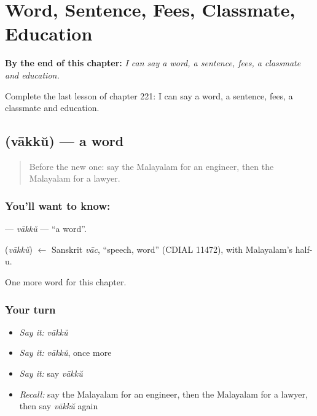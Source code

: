
\chapter{Word, Sentence, Fees, Classmate, Education}
\label{ch:ml-word-sentence-fees-classmate-education}

\begin{chapteropening}
\textbf{By the end of this chapter:} \emph{I can say a word, a sentence, fees, a classmate and education.}

Complete the last lesson of chapter 221: I can say a word, a sentence, fees, a classmate and education.
\end{chapteropening}

\section[\texorpdfstring{\ml{വാക്ക്} (vākkŭ)}{വാക്ക് (vākkŭ)}]{ (vākkŭ) — a word}

\label{lesson:ML-C221-vakku}



\begin{quote}
Before the new one: say the Malayalam for an engineer, then the Malayalam for a lawyer.
\end{quote}

\subsection*{You'll want to know: }
\textbf{} — \emph{vākkŭ} — \textquotedblleft{}a word\textquotedblright{}.

\begin{cousinweb}
\textbf{} (\emph{vākkŭ}) $\leftarrow$ Sanskrit \emph{vāc}, \textquotedblleft{}speech, word\textquotedblright{} (CDIAL 11472), with Malayalam's half-u.
\end{cousinweb}

\begin{grammarlens}[title={What you've built}]
One more word for this chapter.
\end{grammarlens}

\subsection*{Your turn}
\begin{itemize}
\raggedright
  \item \emph{Say it:} \emph{vākkŭ}
  \item \emph{Say it:} \emph{vākkŭ}, once more
  \item \emph{Say it:} say \emph{vākkŭ}
  \item \emph{Recall:} say the Malayalam for an engineer, then the Malayalam for a lawyer, then say \emph{vākkŭ} again
\end{itemize}

